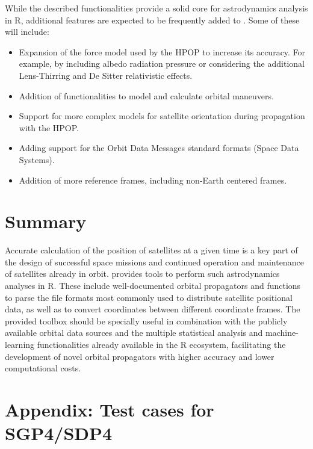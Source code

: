 While the described functionalities provide a solid core for astrodynamics analysis in R, additional features are expected to be frequently added to . Some of these will include:

\begin{itemize}
\tightlist
\item
  Expansion of the force model used by the HPOP to increase its accuracy. For example, by including albedo radiation pressure or considering the additional Lens-Thirring and De Sitter relativistic effects.
\item
  Addition of functionalities to model and calculate orbital maneuvers.
\item
  Support for more complex models for satellite orientation during propagation with the HPOP.
\item
  Adding support for the Orbit Data Messages standard formats (Space Data Systems).
\item
  Addition of more reference frames, including non-Earth centered frames.
\end{itemize}

\hypertarget{summary}{%
\section{Summary}\label{summary}}

Accurate calculation of the position of satellites at a given time is a key part of the design of successful space missions and continued operation and maintenance of satellites already in orbit.  provides tools to perform such astrodynamics analyses in R. These include well-documented orbital propagators and functions to parse the file formats most commonly used to distribute satellite positional data, as well as to convert coordinates between different coordinate frames. The provided toolbox should be specially useful in combination with the publicly available orbital data sources and the multiple statistical analysis and machine-learning functionalities already available in the R ecosystem, facilitating the development of novel orbital propagators with higher accuracy and lower computational costs.

\hypertarget{appendix-test-cases-for-sgp4sdp4}{%
\section{Appendix: Test cases for SGP4/SDP4}\label{appendix-test-cases-for-sgp4sdp4}}

